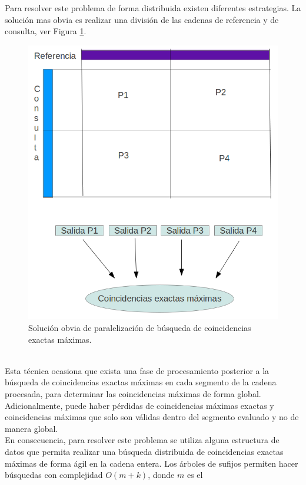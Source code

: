 \documentclass[12pt,a4paper]{article}
\begin{document}
Para resolver este problema de forma distribuida existen diferentes estrategias. La 
solución mas obvia es realizar una división de las cadenas de referencia y
de consulta, ver Figura \ref{fig:para}.
\begin{figure}[h]
\begin{center}
\includegraphics[scale=0.3]{naive.png}
\caption{Solución obvia de paralelización de búsqueda de coincidencias exactas máximas.}
\label{fig:para}
\end{center}
\end{figure}
\\Esta técnica ocasiona que exista una fase de procesamiento posterior a la búsqueda de 
coincidencias exactas máximas en cada segmento de la cadena procesada, para determinar
las coincidencias máximas de forma global. Adicionalmente, puede haber pérdidas de 
coincidencias máximas exactas y coincidencias máximas que solo son válidas dentro del 
segmento evaluado y no de manera global.\\
En consecuencia, para resolver este problema se utiliza alguna estructura de datos que 
permita realizar una búsqueda distribuida de coincidencias exactas máximas de forma ágil 
en la cadena entera. Los árboles de sufijos permiten hacer 
búsquedas con complejidad $O(m+k)$, donde $m$ es el 
\end{document}
